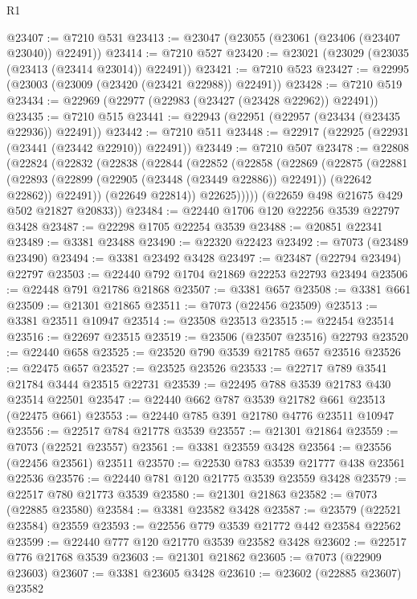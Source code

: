 \begin{lexlean}{R1}
\begin{coremodule}
@23407 := @7210 @531
@23413 := @23047 (@23055 (@23061 (@23406 (@23407 @23040)) @22491))
@23414 := @7210 @527
@23420 := @23021 (@23029 (@23035 (@23413 (@23414 @23014)) @22491))
@23421 := @7210 @523
@23427 := @22995 (@23003 (@23009 (@23420 (@23421 @22988)) @22491))
@23428 := @7210 @519
@23434 := @22969 (@22977 (@22983 (@23427 (@23428 @22962)) @22491))
@23435 := @7210 @515
@23441 := @22943 (@22951 (@22957 (@23434 (@23435 @22936)) @22491))
@23442 := @7210 @511
@23448 := @22917 (@22925 (@22931 (@23441 (@23442 @22910)) @22491))
@23449 := @7210 @507
@23478 := @22808
    (@22824
      (@22832
        (@22838
          (@22844
            (@22852
              (@22858
                (@22869
                  (@22875
                    (@22881
                      (@22893 (@22899 (@22905 (@23448 (@23449 @22886)) @22491)) (@22642 @22862))
                      @22491))
                  (@22649 @22814))
                @22625)))))
      (@22659 @498 @21675 @429 @502 @21827 @20833))
@23484 := @22440 @1706 @120 @22256 @3539 @22797 @3428
@23487 := @22298 @1705 @22254 @3539
@23488 := @20851 @22341
@23489 := @3381 @23488
@23490 := @22320 @22423
@23492 := @7073 (@23489 @23490)
@23494 := @3381 @23492 @3428
@23497 := @23487 (@22794 @23494) @22797
@23503 := @22440 @792 @1704 @21869 @22253 @22793 @23494
@23506 := @22448 @791 @21786 @21868
@23507 := @3381 @657
@23508 := @3381 @661
@23509 := @21301 @21865
@23511 := @7073 (@22456 @23509)
@23513 := @3381 @23511 @10947
@23514 := @23508 @23513
@23515 := @22454 @23514
@23516 := @22697 @23515
@23519 := @23506 (@23507 @23516) @22793
@23520 := @22440 @658
@23525 := @23520 @790 @3539 @21785 @657 @23516
@23526 := @22475 @657
@23527 := @23525 @23526
@23533 := @22717 @789 @3541 @21784 @3444 @23515 @22731
@23539 := @22495 @788 @3539 @21783 @430 @23514 @22501
@23547 := @22440 @662 @787 @3539 @21782 @661 @23513 (@22475 @661)
@23553 := @22440 @785 @391 @21780 @4776 @23511 @10947
@23556 := @22517 @784 @21778 @3539
@23557 := @21301 @21864
@23559 := @7073 (@22521 @23557)
@23561 := @3381 @23559 @3428
@23564 := @23556 (@22456 @23561) @23511
@23570 := @22530 @783 @3539 @21777 @438 @23561 @22536
@23576 := @22440 @781 @120 @21775 @3539 @23559 @3428
@23579 := @22517 @780 @21773 @3539
@23580 := @21301 @21863
@23582 := @7073 (@22885 @23580)
@23584 := @3381 @23582 @3428
@23587 := @23579 (@22521 @23584) @23559
@23593 := @22556 @779 @3539 @21772 @442 @23584 @22562
@23599 := @22440 @777 @120 @21770 @3539 @23582 @3428
@23602 := @22517 @776 @21768 @3539
@23603 := @21301 @21862
@23605 := @7073 (@22909 @23603)
@23607 := @3381 @23605 @3428
@23610 := @23602 (@22885 @23607) @23582

\end{coremodule}
\end{lexlean}
